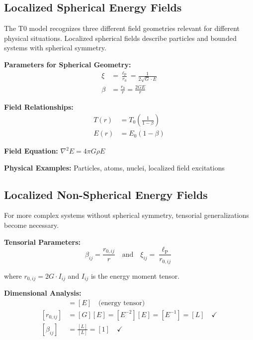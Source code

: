 \documentclass[12pt,a4paper]{report}
\newcommand{\lP}{\ell_{\text{P}}}         %
\newcommand{\rzero}{r_0}                  %
\begin{document}
	\subsection{Localized Spherical Energy Fields}\label{subsec:localized_spherical}
	
	The T0 model recognizes three different field geometries relevant for different physical situations. Localized spherical fields describe particles and bounded systems with spherical symmetry.
	
	\textbf{Parameters for Spherical Geometry:}
	\begin{align}
		\xi &= \frac{\lP}{\rzero} = \frac{1}{2\sqrt{G} \cdot E} \label{eq:xi_localized}\\
		\beta &= \frac{\rzero}{r} = \frac{2GE}{r} \label{eq:beta_localized}
	\end{align}
	
	\textbf{Field Relationships:}
	\begin{align}
		T(r) &= T_0\left(\frac{1}{1 - \beta}\right) \\
		E(r) &= E_0(1 - \beta)
	\end{align}
	
	\textbf{Field Equation:} $\nabla^2 E = 4\pi G \rho E$
	
	\textbf{Physical Examples:} Particles, atoms, nuclei, localized field excitations
	
	\subsection{Localized Non-Spherical Energy Fields}\label{subsec:localized_non_spherical}
	
	For more complex systems without spherical symmetry, tensorial generalizations become necessary.
	
	\textbf{Tensorial Parameters:}
	\begin{equation}
		\beta_{ij} = \frac{r_{0,ij}}{r} \quad \text{and} \quad 	\xi_{ij} = \frac{\lP}{r_{0,ij}}
		\label{eq:tensorial_parameters}
	\end{equation}
	
	where $r_{0,ij} = 2G \cdot I_{ij}$ and $I_{ij}$ is the energy moment tensor.
	
	\textbf{Dimensional Analysis:}
	\begin{align}
		[I_{ij}] &= [E] \quad \text{(energy tensor)} \\
		[r_{0,ij}] &= [G][E] = [E^{-2}][E] = [E^{-1}] = [L] \quad \checkmark \\
		[\beta_{ij}] &= \frac{[L]}{[L]} = [1] \quad \checkmark
	\end{align}
	
\end{document}
